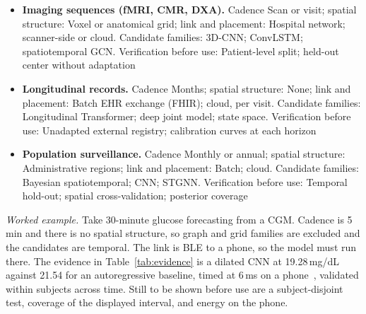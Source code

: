 \documentclass[journal]{IEEEtran}
\begin{document}
\begin{itemize}
\item \textbf{Imaging sequences (fMRI, CMR, DXA).} Cadence Scan or visit; spatial structure: Voxel or anatomical grid; link and placement: Hospital network; scanner-side or cloud. Candidate families: 3D-CNN; ConvLSTM; spatiotemporal GCN. Verification before use: Patient-level split; held-out center without adaptation~\cite{9,4,5,glaser2022deep}
\item \textbf{Longitudinal records.} Cadence Months; spatial structure: None; link and placement: Batch EHR exchange (FHIR); cloud, per visit. Candidate families: Longitudinal Transformer; deep joint model; state space. Verification before use: Unadapted external registry; calibration curves at each horizon~\cite{lin2022deep,nitski2021long}
\item \textbf{Population surveillance.} Cadence Monthly or annual; spatial structure: Administrative regions; link and placement: Batch; cloud. Candidate families: Bayesian spatiotemporal; CNN; STGNN. Verification before use: Temporal hold-out; spatial cross-validation; posterior coverage~\cite{3,XiaoLi2016DiabetesSpatiotemporal}
\end{itemize}

\noindent\emph{Worked example.} Take 30-minute glucose forecasting from a CGM. Cadence is 5\,min and there is no spatial structure, so graph and grid families are excluded and the candidates are temporal. The link is BLE to a phone, so the model must run there. The evidence in Table~\ref{tab:evidence} is a dilated CNN at 19.28\,mg/dL against 21.54 for an autoregressive baseline, timed at 6\,ms on a phone~\cite{Li2020GluNet}, validated within subjects across time. Still to be shown before use are a subject-disjoint test, coverage of the displayed interval, and energy on the phone.
\end{document}
